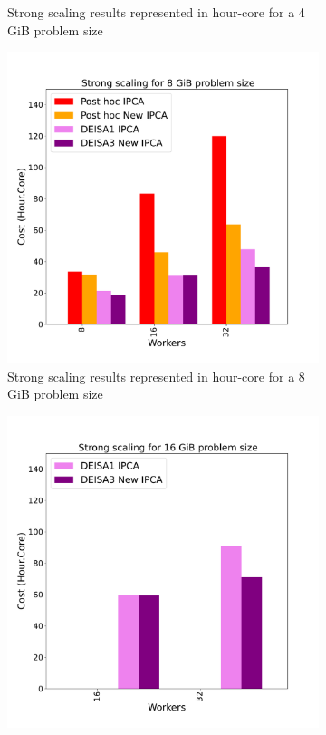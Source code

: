 \begin{figure}[hb]
\begin{subfigure}[b]{0.4\textwidth}
         \caption{Strong scaling results represented in hour-core for a 4\,GiB problem size}
         \label{fig:AD4}
     \end{subfigure}
     \vfill
     \begin{subfigure}[b]{0.4\textwidth}
         \centering
         \includegraphics[width=\textwidth, height=\textwidth]{figures/AD8_1vs3vspost1vspost2.pdf}
         \caption{Strong scaling results represented in hour-core for a 8\,GiB problem size}
         \label{fig:AD8}
     \end{subfigure}
     \hfill
     \begin{subfigure}[b]{0.4\textwidth}
         \centering
         \includegraphics[width=\textwidth, height=\textwidth]{figures/AD16_1vs3vspost1vspost2.pdf}

\end{subfigure}
\end{figure}
